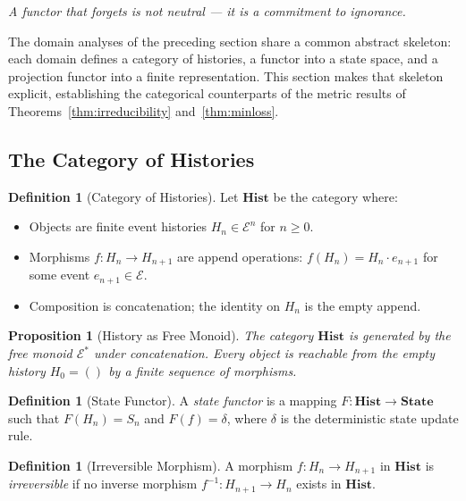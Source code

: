 \documentclass[12pt, twoside]{article}
\theoremstyle{plain}
\newtheorem{proposition}[theorem]{Proposition}
\theoremstyle{definition}
\newtheorem{definition}[theorem]{Definition}
\theoremstyle{remark}
\begin{document}
\epigraph{\itshape
  A functor that forgets is not neutral — it is a commitment to ignorance.}{}

The domain analyses of the preceding section share a common
abstract skeleton: each domain defines a category of histories,
a functor into a state space, and a projection functor into
a finite representation.
This section makes that skeleton explicit, establishing the
categorical counterparts of the metric results of
Theorems~\ref{thm:irreducibility} and~\ref{thm:minloss}.

\subsection{The Category of Histories}

\begin{definition}[Category of Histories]
Let $\mathbf{Hist}$ be the category where:
\begin{itemize}
  \item Objects are finite event histories $H_n \in \mathcal{E}^n$
    for $n \geq 0$.
  \item Morphisms $f: H_n \to H_{n+1}$ are append operations:
    $f(H_n) = H_n \cdot e_{n+1}$ for some event $e_{n+1} \in \mathcal{E}$.
  \item Composition is concatenation; the identity on $H_n$
    is the empty append.
\end{itemize}
\end{definition}

\begin{proposition}[History as Free Monoid]
The category $\mathbf{Hist}$ is generated by the free monoid
$\mathcal{E}^*$ under concatenation.
Every object is reachable from the empty history $H_0 = ()$
by a finite sequence of morphisms.
\end{proposition}

\begin{definition}[State Functor]
A \emph{state functor} is a mapping
$F: \mathbf{Hist} \to \mathbf{State}$
such that $F(H_n) = S_n$ and $F(f) = \delta$,
where $\delta$ is the deterministic state update rule.
\end{definition}

\begin{definition}[Irreversible Morphism]
A morphism $f: H_n \to H_{n+1}$ in $\mathbf{Hist}$ is
\emph{irreversible} if no inverse morphism
$f^{-1}: H_{n+1} \to H_n$ exists in $\mathbf{Hist}$.
\end{definition}
\end{document}
